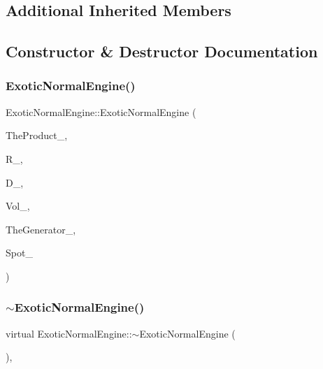 \subsection*{Additional Inherited Members}


\subsection{Constructor \& Destructor Documentation}
\hypertarget{classExoticNormalEngine_a3a303c603779c8760aa2c7dc45829a8f}{}\label{classExoticNormalEngine_a3a303c603779c8760aa2c7dc45829a8f} 
\subsubsection{\texorpdfstring{Exotic\+Normal\+Engine()}{ExoticNormalEngine()}}
{\footnotesize\ttfamily Exotic\+Normal\+Engine\+::\+Exotic\+Normal\+Engine (\begin{DoxyParamCaption}\item[{const \hyperlink{classWrapper}{Wrapper}$<$ \hyperlink{classPathDependent}{Path\+Dependent} $>$ \&}]{The\+Product\+\_\+,  }\item[{const \hyperlink{classParameters}{Parameters} \&}]{R\+\_\+,  }\item[{const \hyperlink{classParameters}{Parameters} \&}]{D\+\_\+,  }\item[{const \hyperlink{classParameters}{Parameters} \&}]{Vol\+\_\+,  }\item[{const \hyperlink{classWrapper}{Wrapper}$<$ \hyperlink{classRandomBase}{Random\+Base} $>$ \&}]{The\+Generator\+\_\+,  }\item[{double}]{Spot\+\_\+ }\end{DoxyParamCaption})}

\hypertarget{classExoticNormalEngine_ab8c6d958414dad93d33895804027b690}{}\label{classExoticNormalEngine_ab8c6d958414dad93d33895804027b690} 
\subsubsection{\texorpdfstring{$\sim$\+Exotic\+Normal\+Engine()}{~ExoticNormalEngine()}}
{\footnotesize\ttfamily virtual Exotic\+Normal\+Engine\+::$\sim$\+Exotic\+Normal\+Engine (\begin{DoxyParamCaption}{ }\end{DoxyParamCaption})\hspace{0.3cm}{\ttfamily [inline]}, {\ttfamily [virtual]}}



